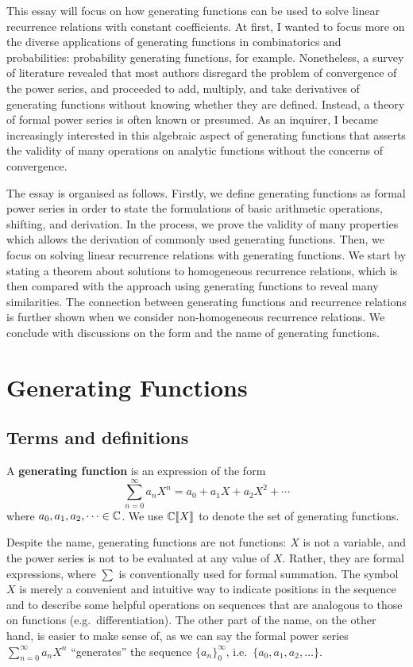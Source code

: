 \documentclass[a4paper, 12pt]{report}
\begin{document}
This essay will focus on how generating functions can be used to solve linear recurrence relations with constant coefficients. At first, I wanted to focus more on the diverse applications of generating functions in combinatorics and probabilities: probability generating functions, for example. Nonetheless, a survey of literature revealed that most authors disregard the problem of convergence of the power series, and proceeded to add, multiply, and take derivatives of generating functions without knowing whether they are defined. Instead, a theory of formal power series is often known or presumed. As an inquirer, I became increasingly interested in this algebraic aspect of generating functions that asserts the validity of many operations on analytic functions without the concerns of convergence.

The essay is organised as follows. Firstly, we define generating functions as formal power series in order to state the formulations of basic arithmetic operations, shifting, and derivation. In the process, we prove the validity of many properties which allows the derivation of commonly used generating functions. Then, we focus on solving linear recurrence relations with generating functions. We start by stating a theorem about solutions to homogeneous recurrence relations, which is then compared with the approach using generating functions to reveal many similarities. The connection between generating functions and recurrence relations is further shown when we consider non-homogeneous recurrence relations. We conclude with discussions on the form and the name of generating functions.





{\let\clearpage\relax\chapter{Generating Functions}\label{ch:gf}}
\section{Terms and definitions}
\begin{defn}\label{def:gf-def}
A \textbf{generating function} is an expression of the form 
\[\sum_{n = 0}^{\infty} a_n X^n = a_0 + a_1 X + a_2 X^2 + \cdots\]
where $a_0, a_1, a_2, \dots \in \mathbb{C}$. We use $\mathbb{C}\llbracket X \rrbracket$ to denote the set of generating functions.
\end{defn}

Despite the name, generating functions are not functions: $X$ is not a variable, and the power series is not to be evaluated at any value of $X$. Rather, they are formal expressions, where $\sum$ is conventionally used for formal summation. The symbol $X$ is merely a convenient and intuitive way to indicate positions in the sequence and to describe some helpful operations on sequences that are analogous to those on functions (e.g.\ differentiation). The other part of the name, on the other hand, is easier to make sense of, as we can say the formal power series $\sum_{n = 0}^{\infty} a_n X^n$ ``generates'' the sequence $\{a_n\}_0^\infty$, i.e.\ $\{a_0, a_1, a_2, \dots\}$.
\end{document}
